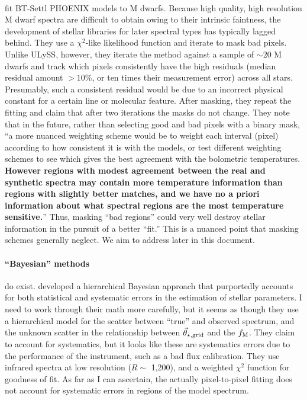 \documentclass[preprint]{aastex} %
\newcommand{\vt}{\vec{\theta}}
\newcommand{\vg}{\vt_{\star, {\rm grid}}}
\newcommand{\fM}{f_{\rm M}}
\begin{document}
\paragraph{\citet{mga13}} fit BT-Settl PHOENIX models to M dwarfs. Because high quality, high resolution M dwarf spectra are difficult to obtain owing to their intrinsic faintness, the development of stellar libraries for later spectral types has typically lagged behind. They use a $\chi^2$-like likelihood function and iterate to mask bad pixels. Unlike ULySS, however, they iterate the method against a sample of $\sim 20$ M dwarfs and track which pixels consistently have the high residuals (median residual amount $> 10$\%, or ten times their measurement error) across all stars. Presumably, such a consistent residual would be due to an incorrect physical constant for a certain line or molecular feature. After masking, they repeat the fitting and claim that after two iterations the masks do not change. They note that in the future, rather than selecting good and bad pixels with a binary mask, ``a more nuanced weighting scheme would be to weight each interval (pixel) according to how consistent it is with the models, or test different weighting schemes to see which gives the best agreement with the bolometric temperatures. \textbf{However regions with modest agreement between the real and synthetic spectra may contain more temperature information than regions with slightly better matches, and we have no a priori information about what spectral regions are the most temperature sensitive.}'' Thus, masking ``bad regions'' could very well destroy stellar information in the pursuit of a better ``fit.'' This is a nuanced point that masking schemes generally neglect. We aim to address later in this document.

\paragraph{``Bayesian'' methods} do exist. \citet{sdm+07} developed a hierarchical Bayesian approach that purportedly accounts for both statistical and systematic errors in the estimation of stellar parameters. I need to work through their math more carefully, but it seems as though they use a hierarchical model for the scatter between ``true'' and observed spectrum, and the unknown scatter in the relationship between $\vg$ and the $\fM$. They claim to account for systematics, but it looks like these are systematics errors due to the performance of the instrument, such as a bad flux calibration. They use infrared spectra at low resolution ($R \sim $ 1,200), and a weighted $\chi^2$ function for goodness of fit. As far as I can ascertain, the actually pixel-to-pixel fitting does not account for systematic errors in regions of the model spectrum.
\end{document}
